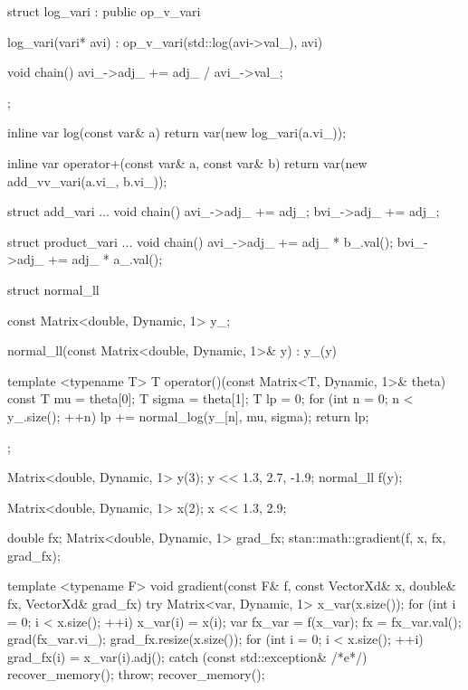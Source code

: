 \documentclass[10pt]{report}
\begin{document}
%
\begin{stancode}
struct log_vari : public op_v_vari {
  log_vari(vari* avi) :
    op_v_vari(std::log(avi->val_), avi) { }

  void chain() {
    avi_->adj_ += adj_ / avi_->val_;
  }
};

inline var log(const var& a) {
  return var(new log_vari(a.vi_));
}
\end{stancode}


%
\begin{stancode}
inline var operator+(const var& a, const var& b) {    
  return var(new add_vv_vari(a.vi_, b.vi_));
}

struct add_vari  ...
  void chain() {
    avi_->adj_ += adj_;
    bvi_->adj_ += adj_;
  }

struct product_vari ...
  void chain() {
    avi_->adj_ += adj_ * b_.val();
    bvi_->adj_ += adj_ * a_.val();
  }
\end{stancode}


%
\begin{stancode}
struct normal_ll {
  const Matrix<double, Dynamic, 1> y_;

  normal_ll(const Matrix<double, Dynamic, 1>& y) : y_(y) { }

  template <typename T>
  T operator()(const Matrix<T, Dynamic, 1>& theta) const {
    T mu = theta[0];   
    T sigma = theta[1];
    T lp = 0;
    for (int n = 0; n < y_.size(); ++n)
      lp += normal_log(y_[n], mu, sigma);
    return lp;
  }
};
\end{stancode}


%
\begin{stancode}
Matrix<double, Dynamic, 1> y(3);
y << 1.3, 2.7, -1.9;
normal_ll f(y);

Matrix<double, Dynamic, 1> x(2);
x << 1.3, 2.9;

double fx;
Matrix<double, Dynamic, 1> grad_fx;
stan::math::gradient(f, x, fx, grad_fx);
\end{stancode}


%
\vspace*{-6pt}
\begin{stancode}
template <typename F> 
void gradient(const F& f,  const VectorXd& x,
              double& fx,  VectorXd& grad_fx) {
  try {
    Matrix<var, Dynamic, 1> x_var(x.size());
    for (int i = 0; i < x.size(); ++i) x_var(i) = x(i);
    var fx_var = f(x_var); 
    fx = fx_var.val();
    grad(fx_var.vi_);
    grad_fx.resize(x.size());
    for (int i = 0; i < x.size(); ++i)
      grad_fx(i) = x_var(i).adj();
  } catch (const std::exception& /*e*/) {
    recover_memory();   throw;
  }
  recover_memory();
}
\end{stancode}
\end{document}
